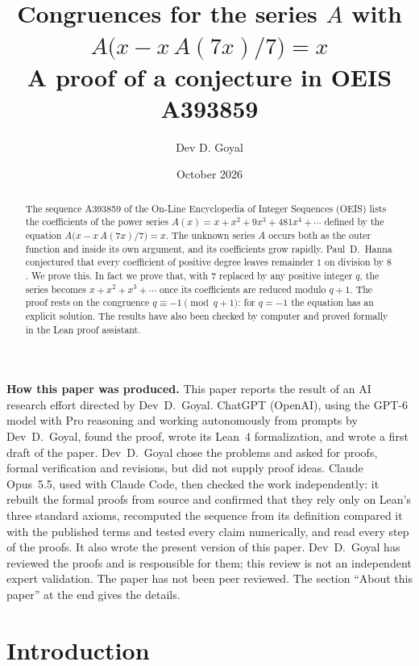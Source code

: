 \documentclass[11pt,a4paper]{article}
\title{Congruences for the series $A$ with $A\bigl(x-x\,A(7x)/7\bigr)=x$\\[6pt]\large A proof of a conjecture in OEIS A393859}
\author{Dev D. Goyal}
\date{October 2026}
\theoremstyle{definition}
\theoremstyle{remark}
\begin{document}
\maketitle
\begin{abstract}
The sequence A393859 of the On-Line Encyclopedia of Integer Sequences (OEIS) lists the coefficients of the power
series $A(x)=x+x^2+9x^3+481x^4+\cdots$ defined by the equation
$A\bigl(x-x\,A(7x)/7\bigr)=x$. The unknown series $A$ occurs both as the outer function and inside its own argument, and its coefficients grow rapidly.
Paul~D.~Hanna conjectured that every coefficient of positive degree leaves remainder $1$ on division by $8$. We prove this. In fact we prove that, with $7$ replaced by any positive integer $q$, the series becomes $x+x^2+x^3+\cdots$ once its coefficients are reduced modulo $q+1$. The proof rests on the congruence $q\equiv-1\pmod{q+1}$: for $q=-1$ the equation
has an explicit solution. The results have also been checked by computer and proved formally in the
Lean proof assistant.
\end{abstract}
\begin{center}\begin{minipage}{0.88\linewidth}\small
\textbf{How this paper was produced.} This paper reports the result of an AI research effort directed by
Dev~D.~Goyal. ChatGPT (OpenAI), using the GPT-6 model with Pro reasoning and working autonomously from prompts by
Dev~D.~Goyal, found the proof, wrote its Lean~4 formalization, and wrote a first draft of the paper.
Dev~D.~Goyal chose the problems and asked for proofs, formal verification and revisions, but did not supply proof
ideas. Claude Opus~5.5, used with Claude Code, then checked the work independently: it rebuilt the formal proofs from
source and confirmed that they rely only on Lean's three standard axioms, recomputed the sequence from its definition
compared it with the published terms and tested every claim numerically, and read every step of the proofs. It also wrote the present
version of this paper.
Dev~D.~Goyal has reviewed the proofs and is responsible for them; this review is not an independent expert validation.
The paper has not been peer reviewed.
The section ``About this paper'' at the end gives the details.
\end{minipage}\end{center}

\section{Introduction}
\end{document}
